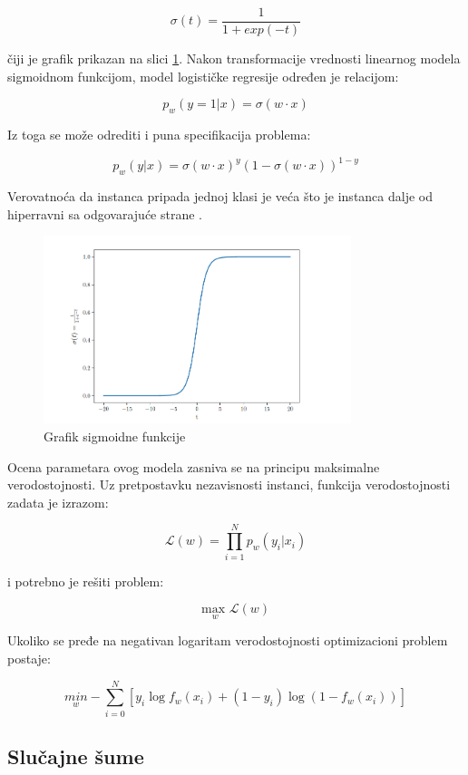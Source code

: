 $$\sigma(t) = \dfrac{1}{1+exp(-t)}$$

čiji je grafik prikazan na slici \ref{fig:sigmoid}. Nakon transformacije vrednosti linearnog modela sigmoidnom funkcijom, model logističke regresije određen je relacijom:

$$p_w(y = 1 | x) = \sigma(w \cdot x)$$


Iz toga se može odrediti i puna specifikacija problema:

$$p_w(y | x) = \sigma(w \cdot x)^y (1 - \sigma(w \cdot x))^{1-y}$$

Verovatnoća da instanca pripada jednoj klasi je veća što je instanca dalje od hiperravni sa odgovarajuće strane \cite{ml}.

\begin{figure}[h]
	\centering
	\includegraphics[width=0.8\textwidth]{Figures/sigmoid.png}
	\caption{Grafik sigmoidne funkcije \cite{ml}}
	\label{fig:sigmoid}
\end{figure}

Ocena parametara ovog modela zasniva se na principu maksimalne verodostojnosti. Uz pretpostavku nezavisnosti instanci, funkcija verodostojnosti zadata je izrazom:

$$\mathcal{L}(w) = \prod_{i=1}^{N}p_w(y_i|x_i)$$

i potrebno je rešiti problem:

$$\underset{w}{\text{max }}\mathcal{L}(w)$$

Ukoliko se pređe na negativan logaritam verodostojnosti optimizacioni problem postaje:

$$ \underset{w}{min} -\sum_{i=0}^{N} [y_i\log f_w(x_i) + (1-y_i)\log(1 - f_w(x_i))]$$



\subsection{Slučajne šume} 

